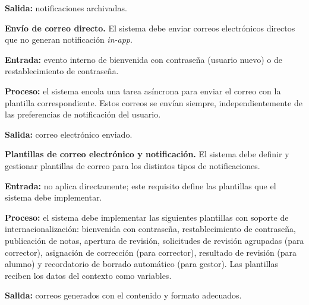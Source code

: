 \begin{functional}
    \textbf{Salida:} notificaciones archivadas.

    \item \textbf{Envío de correo directo.} \label{rf:notifications:direct_email}
    El sistema debe enviar correos electrónicos directos que no generan notificación
    \textit{in-app}.

    \textbf{Entrada:} evento interno de bienvenida con contraseña (usuario nuevo) o de
    restablecimiento de contraseña.

    \textbf{Proceso:} el sistema encola una tarea asíncrona para enviar el correo con la
    plantilla correspondiente. Estos correos se envían siempre, independientemente de las
    preferencias de notificación del usuario.

    \textbf{Salida:} correo electrónico enviado.

    \item \textbf{Plantillas de correo electrónico y notificación.}
    \label{rf:notifications:templates}
    El sistema debe definir y gestionar plantillas de correo para los distintos tipos de
    notificaciones.

    \textbf{Entrada:} no aplica directamente; este requisito define las plantillas que el
    sistema debe implementar.

    \textbf{Proceso:} el sistema debe implementar las siguientes plantillas con soporte de
    internacionalización: bienvenida con contraseña, restablecimiento de contraseña,
    publicación de notas, apertura de revisión, solicitudes de revisión agrupadas (para
    corrector), asignación de corrección (para corrector), resultado de revisión (para
    alumno) y recordatorio de borrado automático (para gestor). Las plantillas reciben los
    datos del contexto como variables.

    \textbf{Salida:} correos generados con el contenido y formato adecuados.

\end{functional}
